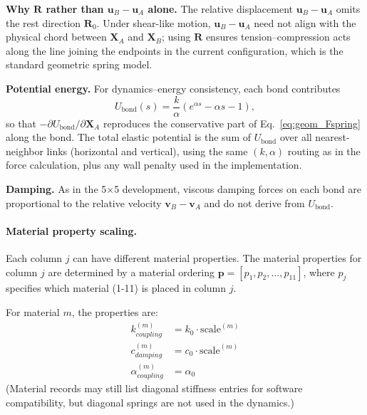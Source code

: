 \documentclass[11pt,a4paper]{article}
\begin{document}
\noindent \textbf{Why $\mathbf{R}$ rather than $\mathbf{u}_B-\mathbf{u}_A$ alone.} The relative displacement $\mathbf{u}_B-\mathbf{u}_A$ omits the rest direction $\mathbf{R}_0$. Under shear-like motion, $\mathbf{u}_B-\mathbf{u}_A$ need not align with the physical chord between $\mathbf{X}_A$ and $\mathbf{X}_B$; using $\mathbf{R}$ ensures tension--compression acts along the line joining the endpoints in the current configuration, which is the standard geometric spring model. \newline

\noindent \textbf{Potential energy.} For dynamics--energy consistency, each bond contributes
\begin{equation}
U_{\mathrm{bond}}(s) = \frac{k}{\alpha}\left(e^{\alpha s} - \alpha s - 1\right),
\label{eq:geom_potential_bond}
\end{equation}
so that $-\partial U_{\mathrm{bond}}/\partial \mathbf{X}_A$ reproduces the conservative part of Eq.~\eqref{eq:geom_Fspring} along the bond. The total elastic potential is the sum of $U_{\mathrm{bond}}$ over all nearest-neighbor links (horizontal and vertical), using the same $(k,\alpha)$ routing as in the force calculation, plus any wall penalty used in the implementation. \newline

\noindent \textbf{Damping.} As in the 5×5 development, viscous damping forces on each bond are proportional to the relative velocity $\mathbf{v}_B-\mathbf{v}_A$ and do not derive from $U_{\mathrm{bond}}$. \newline

\paragraph{Material property scaling.}
\noindent

\noindent Each column $j$ can have different material properties. The material properties for column $j$ are determined by a material ordering $\mathbf{p} = [p_1, p_2, \ldots, p_{11}]$, where $p_j$ specifies which material (1-11) is placed in column $j$. \newline

\noindent For material $m$, the properties are:
\begin{align}
k_{coupling}^{(m)} &= k_0 \cdot \text{scale}^{(m)} \\
c_{damping}^{(m)} &= c_0 \cdot \text{scale}^{(m)} \\
\alpha_{coupling}^{(m)} &= \alpha_0
\end{align}
\noindent (Material records may still list diagonal stiffness entries for software compatibility, but diagonal springs are not used in the dynamics.) \newline
\end{document}
